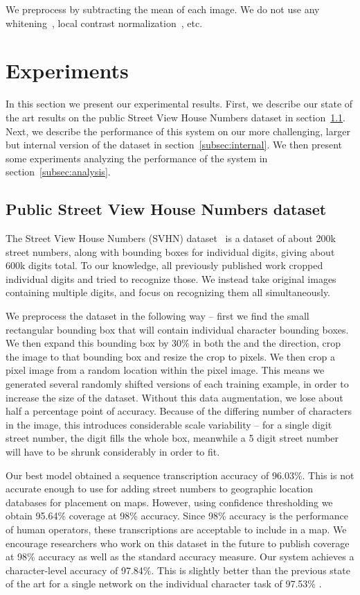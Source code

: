 \documentclass{article} \usepackage{comment}
\begin{document}
We preprocess by subtracting
the mean of each image. We do not use any whitening~\citep{Hyvarinen-2001-small},
local contrast normalization~\citep{sermanet-icpr-12}, etc.

\section{Experiments}
\label{sec:experiments}

In this section we present our experimental results. First, we describe our state of the
art results on the public Street View House Numbers dataset in section~\ref{subsec:public}.
Next, we describe the performance of this system on our more challenging, larger but internal
version of the dataset in section~\ref{subsec:internal}. We then present some experiments
analyzing the performance of the system in section~\ref{subsec:analysis}.

\subsection{Public Street View House Numbers dataset}
\label{subsec:public}

The Street View House Numbers (SVHN) dataset~\citep{Netzer-wkshp-2011} is a dataset of about 200k street numbers, along with bounding boxes for individual digits, giving about 600k digits total. To our knowledge, all previously published work cropped individual digits and tried to recognize those. We instead take original images containing multiple digits, and focus on recognizing them all simultaneously.

We preprocess the dataset in the following way -- first we find the small rectangular bounding box that will contain individual character bounding boxes.
We then expand this bounding box by 30\% in both the  and the  direction, crop the image to that bounding box and resize the crop to  pixels. We then crop a  pixel image from a
random location within the  pixel image. This means we generated several randomly shifted versions
of each training example, in order to increase the size of the dataset. Without this data augmentation, we lose
about half a percentage point of accuracy.
Because of the differing number of characters
in the image, this introduces considerable scale variability -- for a single digit street number, the digit fills the whole box, meanwhile a 5
digit street number will have to be shrunk considerably in order to fit.

Our best model obtained a sequence transcription accuracy of 96.03\%. This is not accurate enough to
use for adding street numbers to geographic location databases for placement on maps.
However, using confidence thresholding we obtain 95.64\% coverage at 98\% accuracy.
Since 98\% accuracy is the performance of human operators, these transcriptions are acceptable to include
in a map. We encourage researchers who work on this dataset in the future to publish coverage at 98\% accuracy
as well as the standard accuracy measure. Our system achieves a character-level accuracy of 97.84\%. This is
slightly better than the previous state of the art for a single network on the individual character task of
97.53\% \citep{Goodfellow-et-al-ICML2013}.
\end{document}
